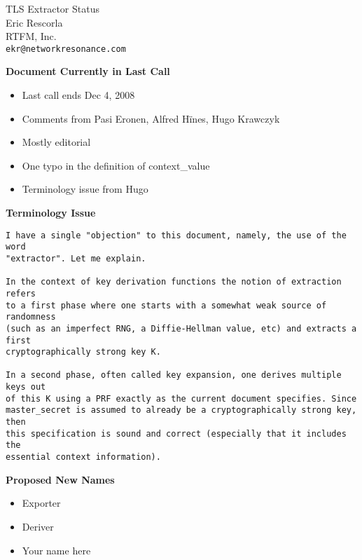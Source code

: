 \documentclass[helvetica]{seminar}
\newcommand{\heading}[1]{%
  \begin{center} 
    \large\bf 
    #1 
  \end{center} 
  \vspace{.4 in}}
\begin{document}
        
\begin{slide}
\begin{center}
\LARGE{{\bf}TLS Extractor Status}\\

\vspace{.3 in}
\large{Eric Rescorla}\\
\large{RTFM, Inc.}\\
\large{\texttt{ekr@networkresonance.com}}
\end{center}
\end{slide}



\begin{slide}
\heading{Document Currently in Last Call}

\begin{itemize}
\item Last call ends Dec 4, 2008
\item Comments from Pasi Eronen, Alfred H\"{i}nes, Hugo Krawczyk
\item Mostly editorial
\item One typo in the definition of \textsf{context\_value}
\item Terminology issue from Hugo
\end{itemize}
\end{slide}


\begin{slide}
\heading{Terminology Issue}


\footnotesize{
\begin{verbatim}
I have a single "objection" to this document, namely, the use of the word
"extractor". Let me explain.

In the context of key derivation functions the notion of extraction refers
to a first phase where one starts with a somewhat weak source of randomness
(such as an imperfect RNG, a Diffie-Hellman value, etc) and extracts a first
cryptographically strong key K.

In a second phase, often called key expansion, one derives multiple keys out
of this K using a PRF exactly as the current document specifies. Since
master_secret is assumed to already be a cryptographically strong key, then
this specification is sound and correct (especially that it includes the
essential context information).
\end{verbatim}
}
\end{slide}


\begin{slide}
\heading{Proposed New Names}

\begin{itemize}
\item Exporter
\item Deriver
\item Your name here
\end{itemize}


\end{slide}
\end{document}
